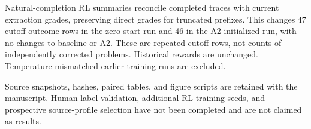 Natural-completion RL summaries reconcile completed traces with current extraction grades, preserving direct grades for truncated prefixes. This changes 47 cutoff-outcome rows in the zero-start run and 46 in the A2-initialized run, with no changes to baseline or A2. These are repeated cutoff rows, not counts of independently corrected problems. Historical rewards are unchanged. Temperature-mismatched earlier training runs are excluded.

Source snapshots, hashes, paired tables, and figure scripts are retained with the manuscript. Human label validation, additional RL training seeds, and prospective source-profile selection have not been completed and are not claimed as results.

